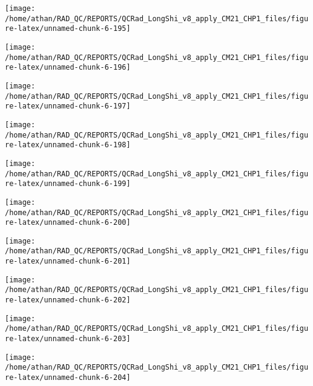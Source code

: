 \documentclass[
  10pt,
  a4paper,oneside]{article}
\begin{document}
\begin{center}\texttt{[image: /home/athan/RAD\_QC/REPORTS/QCRad\_LongShi\_v8\_apply\_CM21\_CHP1\_files/figure-latex/unnamed-chunk-6-195]} \end{center}

\begin{center}\texttt{[image: /home/athan/RAD\_QC/REPORTS/QCRad\_LongShi\_v8\_apply\_CM21\_CHP1\_files/figure-latex/unnamed-chunk-6-196]} \end{center}

\begin{center}\texttt{[image: /home/athan/RAD\_QC/REPORTS/QCRad\_LongShi\_v8\_apply\_CM21\_CHP1\_files/figure-latex/unnamed-chunk-6-197]} \end{center}

\begin{center}\texttt{[image: /home/athan/RAD\_QC/REPORTS/QCRad\_LongShi\_v8\_apply\_CM21\_CHP1\_files/figure-latex/unnamed-chunk-6-198]} \end{center}

\begin{center}\texttt{[image: /home/athan/RAD\_QC/REPORTS/QCRad\_LongShi\_v8\_apply\_CM21\_CHP1\_files/figure-latex/unnamed-chunk-6-199]} \end{center}

\begin{center}\texttt{[image: /home/athan/RAD\_QC/REPORTS/QCRad\_LongShi\_v8\_apply\_CM21\_CHP1\_files/figure-latex/unnamed-chunk-6-200]} \end{center}

\begin{center}\texttt{[image: /home/athan/RAD\_QC/REPORTS/QCRad\_LongShi\_v8\_apply\_CM21\_CHP1\_files/figure-latex/unnamed-chunk-6-201]} \end{center}

\begin{center}\texttt{[image: /home/athan/RAD\_QC/REPORTS/QCRad\_LongShi\_v8\_apply\_CM21\_CHP1\_files/figure-latex/unnamed-chunk-6-202]} \end{center}

\begin{center}\texttt{[image: /home/athan/RAD\_QC/REPORTS/QCRad\_LongShi\_v8\_apply\_CM21\_CHP1\_files/figure-latex/unnamed-chunk-6-203]} \end{center}

\begin{center}\texttt{[image: /home/athan/RAD\_QC/REPORTS/QCRad\_LongShi\_v8\_apply\_CM21\_CHP1\_files/figure-latex/unnamed-chunk-6-204]} \end{center}
\end{document}
